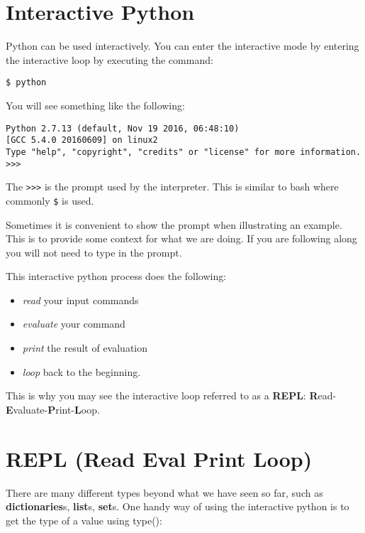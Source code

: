\FILENAME

\section{Interactive Python}\label{interactive-python}

Python can be used interactively. You can enter the interactive mode
by entering the interactive loop by executing the command:

\begin{lstlisting}
$ python
\end{lstlisting}

You will see something like the following:

\begin{lstlisting}
Python 2.7.13 (default, Nov 19 2016, 06:48:10)
[GCC 5.4.0 20160609] on linux2
Type "help", "copyright", "credits" or "license" for more information.
>>>
\end{lstlisting}

The \verb|>>>| is the prompt used by the interpreter. This is similar to
bash where commonly \verb|$| is used.

Sometimes it is convenient to show the prompt when illustrating an
example. This is to provide some context for what we are doing. If you
are following along you will not need to type in the prompt.

This interactive python process does the following:

\begin{itemize}
\item
  \emph{read} your input commands
\item
  \emph{evaluate} your command
\item
  \emph{print} the result of evaluation
\item
  \emph{loop} back to the beginning.
\end{itemize}

This is why you may see the interactive loop referred to as a
\textbf{REPL}:
\textbf{R}ead-\textbf{E}valuate-\textbf{P}rint-\textbf{L}oop.

\section{REPL (Read Eval Print Loop)}\label{repl-read-eval-print-loop}

There are many different types beyond what we have seen so far, such as
\textbf{dictionaries}s, \textbf{list}s, \textbf{set}s. One handy way of
using the interactive python is to get the type of a value using
type():

